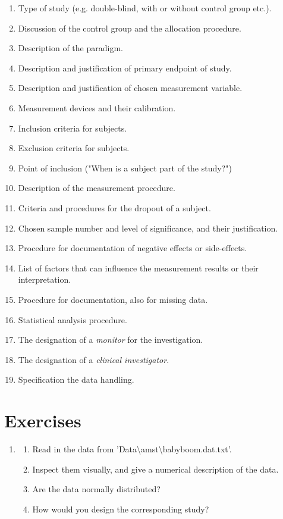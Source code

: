 \begin{enumerate}
  \item Type of study (e.g. double-blind, with or without control group etc.).
  \item Discussion of the control group and the allocation procedure.
  \item Description of the paradigm.
  \item Description and justification of primary endpoint of study.
  \item Description and justification of chosen measurement variable.
  \item Measurement devices and their calibration.
  \item Inclusion criteria for subjects.
  \item Exclusion criteria for subjects.
  \item Point of inclusion ("When is a subject part of the study?")
  \item Description of the measurement procedure.
  \item Criteria and procedures for the dropout of a subject.
  \item Chosen sample number and level of significance, and their justification.
  \item Procedure for documentation of negative effects or side-effects.
  \item List of factors that can influence the measurement results or their interpretation.
  \item Procedure for documentation, also for missing data.
  \item Statistical analysis procedure.
  \item The designation of a \emph{monitor} for the investigation.
  \item The designation of a \emph{clinical investigator}.
  \item Specification the data handling.
\end{enumerate}

\section{Exercises}

\begin{enumerate}
  \item
  \begin{enumerate}
    \item Read in the data from 'Data\textbackslash amst\textbackslash babyboom.dat.txt'.
    \item Inspect them visually, and give a numerical description of the data.
    \item Are the data normally distributed?
    \item How would you design the corresponding study?
  \end{enumerate}

\end{enumerate}


